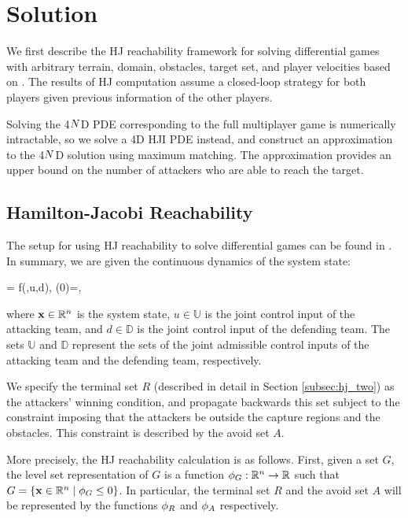 \section{Solution} \label{sec:solution}
We first describe the HJ reachability framework for solving differential games with arbitrary terrain, domain, obstacles, target set, and player velocities based on \cite{j:mitchell-TAC-2005, LSToolbox, Huang2011}. The results of HJ computation assume a closed-loop strategy for both players given previous information of the other players.

Solving the 4$N$D PDE corresponding to the full multiplayer game is numerically intractable, so we solve a 4D HJI PDE instead, and construct an approximation to the 4$N$D solution using maximum matching. The approximation provides an upper bound on the number of attackers who are able to reach the target. 

\subsection{Hamilton-Jacobi Reachability} \label{subsec:hj_background}
The setup for using HJ reachability to solve differential games can be found in \cite{j:mitchell-TAC-2005, LSToolbox, Huang2011}. In summary, we are given the continuous dynamics of the system state:

\bq
\dxj = f(\xj,u,d), \xj(0)=\xjn,
\eq

\noindent where $\mathbf{x}\in\mathbb{R}^n$ is the system state, $u\in\mathbb{U}$ is the joint control input of the attacking team, and $d\in\mathbb{D}$ is the joint control input of the defending team. The sets $\mathbb{U}$ and $\mathbb{D}$ represent the sets of the joint admissible control inputs of the attacking team and the defending team, respectively. 

We specify the terminal set $R$ (described in detail in Section \ref{subsec:hj_two}) as the attackers' winning condition, and propagate backwards this set subject to the constraint imposing that the attackers be outside the capture regions and the obstacles. This constraint is described by the avoid set $A$. 

More precisely, the HJ reachability calculation is as follows. First, given a set $G$, the level set representation of $G$ is a function $\phi_G:\mathbb{R}^n \rightarrow \mathbb{R}$ such that $G = \left\{\mathbf{x}\in\mathbb{R}^n \mid \phi_G\le0\right\}$.
In particular, the terminal set $R$ and the avoid set $A$ will be represented by the functions $\phi_R$ and $\phi_A$ respectively.
 
